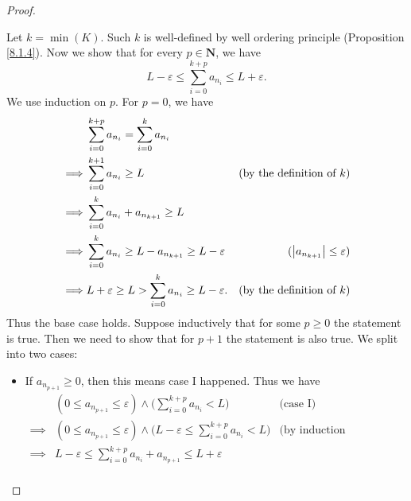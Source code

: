 \begin{proof}
\begin{itemize}
              Let \(k = \min(K)\).
              Such \(k\) is well-defined by well ordering principle (Proposition \ref{8.1.4}).
              Now we show that for every \(p \in \mathbf{N}\), we have
              \[
                  L - \varepsilon \leq \sum_{i = 0}^{k + p} a_{n_i} \leq L + \varepsilon.
              \]
              We use induction on \(p\).
              For \(p = 0\), we have
              \begin{align*}
                           & \sum_{i = 0}^{k + p} a_{n_i} = \sum_{i = 0}^k a_{n_i}                                                           \\
                  \implies & \sum_{i = 0}^{k + 1} a_{n_i} \geq L                                   & \text{(by the definition of \(k\))}     \\
                  \implies & \sum_{i = 0}^k a_{n_i} + a_{n_{k + 1}} \geq L                                                                   \\
                  \implies & \sum_{i = 0}^k a_{n_i} \geq L - a_{n_{k + 1}} \geq L - \varepsilon    & (\abs*{a_{n_{k + 1}}} \leq \varepsilon) \\
                  \implies & L + \varepsilon \geq L > \sum_{i = 0}^k a_{n_i} \geq L - \varepsilon. & \text{(by the definition of \(k\))}
              \end{align*}
              Thus the base case holds.
              Suppose inductively that for some \(p \geq 0\) the statement is true.
              Then we need to show that for \(p + 1\) the statement is also true.
              We split into two cases:
              \begin{itemize}
                  \item If \(a_{n_{p + 1}} \geq 0\), then this means case I happened.
                        Thus we have
                        \begin{align*}
                                     & (0 \leq a_{n_{p + 1}} \leq \varepsilon) \land \Bigg(\sum_{i = 0}^{k + p} a_{n_i} < L\Bigg)                      & \text{(case I)}                  \\
                            \implies & (0 \leq a_{n_{p + 1}} \leq \varepsilon) \land \Bigg(L - \varepsilon \leq \sum_{i = 0}^{k + p} a_{n_i} < L\Bigg) & \text{(by induction hypothesis)} \\
                            \implies & L - \varepsilon \leq \sum_{i = 0}^{k + p} a_{n_i} + a_{n_{p + 1}} \leq L + \varepsilon                                                             \\

\end{align*}
\end{itemize}
\end{itemize}
\end{proof}
